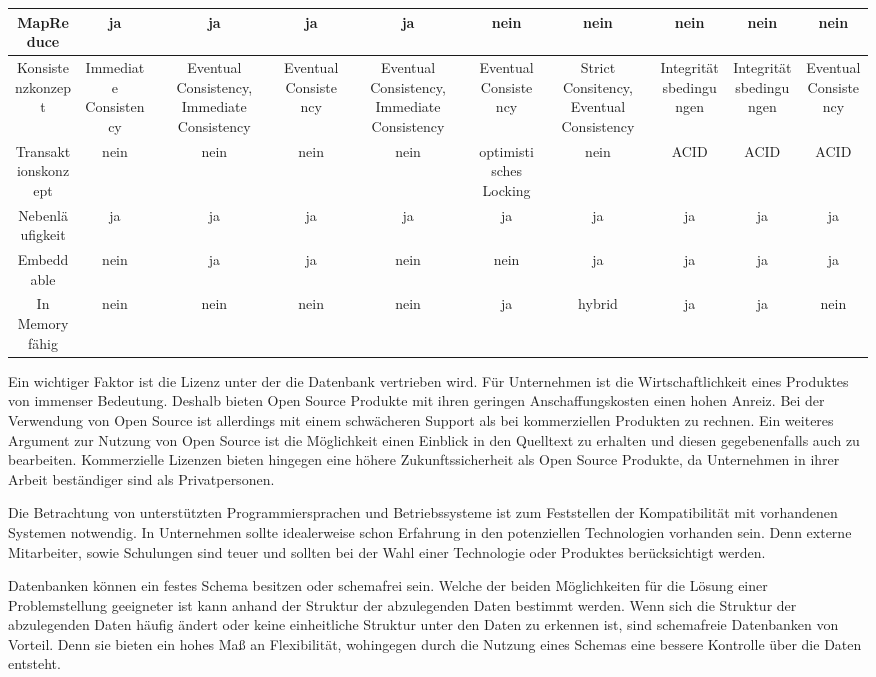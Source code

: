 \begin{table}[H]
\begin{tabulary} {\linewidth} {C | C | C | C | C | C | C | C | C | C}
\midrule
MapReduce & ja & ja & ja & ja & nein & nein & nein & nein & nein\\
\midrule
Konsistenzkonzept & Immediate Consistency & Eventual Consistency, Immediate Consistency & Eventual Consistency & Eventual Consistency, Immediate Consistency & Eventual Consistency & Strict Consitency, Eventual Consistency &  Integritätsbedingungen & Integritätsbedingungen & Eventual Consistency\\
\midrule
Transaktionskonzept & nein & nein & nein & nein & optimistisches Locking & nein & ACID & ACID & ACID\\
\midrule
Nebenläufigkeit & ja & ja & ja & ja & ja & ja & ja & ja & ja\\
\midrule
Embeddable & nein & ja & ja & nein & nein & ja & ja & ja & ja\\
\midrule
In Memory fähig & nein & nein & nein & nein & ja & hybrid & ja & ja & nein\\
\bottomrule
\end{tabulary}
\end{table}

Ein wichtiger Faktor ist die Lizenz unter der die Datenbank vertrieben wird. Für Unternehmen ist die Wirtschaftlichkeit eines Produktes von immenser Bedeutung. Deshalb bieten Open Source Produkte mit ihren geringen Anschaffungskosten einen hohen Anreiz. Bei der Verwendung von Open Source ist allerdings mit einem schwächeren Support als bei kommerziellen Produkten zu rechnen. Ein weiteres Argument zur Nutzung von Open Source ist die Möglichkeit einen Einblick in den Quelltext zu erhalten und diesen gegebenenfalls auch zu bearbeiten. Kommerzielle Lizenzen bieten hingegen eine höhere Zukunftssicherheit als Open Source Produkte, da Unternehmen in ihrer Arbeit beständiger sind als Privatpersonen.

Die Betrachtung von unterstützten Programmiersprachen und Betriebssysteme ist zum Feststellen der Kompatibilität mit vorhandenen Systemen notwendig. In Unternehmen sollte idealerweise schon Erfahrung in den potenziellen Technologien vorhanden sein. Denn externe Mitarbeiter, sowie Schulungen sind teuer und sollten bei der Wahl einer Technologie oder Produktes berücksichtigt werden. 

Datenbanken können ein festes Schema besitzen oder schemafrei sein. Welche der beiden Möglichkeiten für die Lösung einer Problemstellung geeigneter ist kann anhand der Struktur der abzulegenden Daten bestimmt werden. Wenn sich die Struktur der abzulegenden Daten häufig ändert oder keine einheitliche Struktur unter den Daten zu erkennen ist, sind schemafreie Datenbanken von Vorteil. Denn sie bieten ein hohes Maß an Flexibilität, wohingegen durch die Nutzung eines Schemas eine bessere Kontrolle über die Daten entsteht.  

